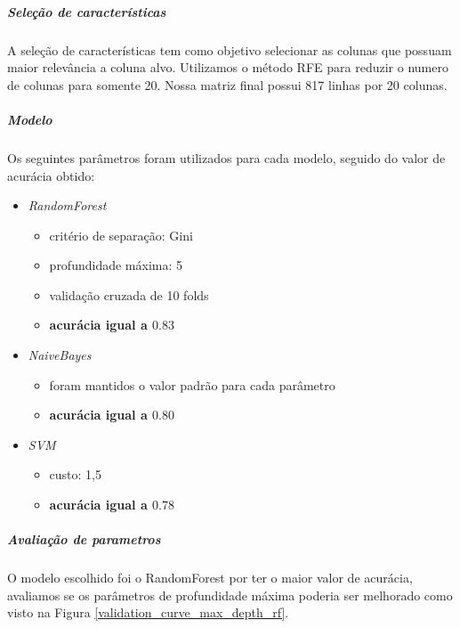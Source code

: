 \subparagraph{Seleção de características}

A seleção de características tem como objetivo selecionar as colunas que possuam maior relevância a coluna alvo. Utilizamos o método RFE para reduzir o numero de colunas para somente 20. Nossa matriz final possui 817 linhas por 20 colunas.

\subparagraph{Modelo}

Os seguintes parâmetros foram utilizados para cada modelo, seguido do valor de acurácia obtido:
	
\begin{itemize}
  \item \textit{RandomForest}
  \begin{itemize}
    \item critério de separação: Gini
    \item profundidade máxima: 5
    \item validação cruzada de 10 folds
    \item \textbf{acurácia igual a $0.83$}
  \end{itemize}
  \item \textit{NaiveBayes}
  \begin{itemize}
    \item foram mantidos o valor padrão para cada parâmetro
    \item \textbf{acurácia igual a $0.80$}
  \end{itemize}
  \item \textit{SVM}
  \begin{itemize}
    \item custo: 1,5
    \item \textbf{acurácia igual a $0.78$}
  \end{itemize}
\end{itemize}	

\subparagraph{Avaliação de parametros}
	
O modelo escolhido foi o RandomForest por ter o maior valor de acurácia, avaliamos se os parâmetros de profundidade máxima poderia ser melhorado como visto na Figura \ref{validation_curve_max_depth_rf}.

